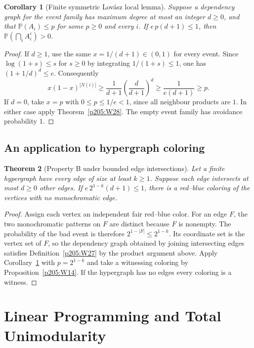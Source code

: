 \documentclass[11pt,oneside,openany]{book}
\theoremstyle{plain}
\newtheorem{theorem}{Theorem}[chapter]
\newtheorem{corollary}[theorem]{Corollary}
\theoremstyle{definition}
\theoremstyle{remark}
\begin{document}
\begin{corollary}[Finite symmetric Lov\'asz local lemma]
\label{p205:W29}
Suppose a dependency graph for the event family has maximum degree
at most an integer \(d\ge0\), and that \(\mathbb P(A_i)\le p\) for
some \(p\ge0\) and every \(i\). If \(e\,p(d+1)\le1\), then
\(\mathbb P(\bigcap_i A_i^c)>0\).
\end{corollary}

\begin{proof}
If \(d\ge1\), use the same \(x=1/(d+1)\in(0,1)\) for every event.
Since \(\log(1+s)\le s\) for \(s\ge0\) by integrating
\(1/(1+s)\le1\), one has \((1+1/d)^d\le e\). Consequently
\[
 x(1-x)^{|N(i)|}\ge \frac{1}{d+1}\left(\frac d{d+1}\right)^d
     \ge\frac{1}{e(d+1)}\ge p .
\]
If \(d=0\), take \(x=p\) with \(0\le p\le1/e<1\), since all neighbour
products are \(1\). In either case apply Theorem~\ref{p205:W28}.
The empty event family has avoidance probability \(1\).
\end{proof}

\section{An application to hypergraph coloring}

\begin{theorem}[Property B under bounded edge intersections]
\label{p205:W30}
Let a finite hypergraph have every edge of size at least \(k\ge1\).
Suppose each edge intersects at most \(d\ge0\) other edges.
If \(e\,2^{1-k}(d+1)\le1\), there is a red--blue coloring
of the vertices with no monochromatic edge.
\end{theorem}

\begin{proof}
Assign each vertex an independent fair red--blue color.
For an edge \(F\), the two monochromatic patterns on \(F\) are
distinct because \(F\) is nonempty. The probability of the bad
event is therefore \(2^{1-|F|}\le 2^{1-k}\). Its coordinate set
is the vertex set of \(F\), so the dependency graph obtained by
joining intersecting edges satisfies Definition~\ref{p205:W27}
by the product argument above. Apply
Corollary~\ref{p205:W29} with \(p=2^{1-k}\) and take a witnessing
coloring by Proposition~\ref{p205:W14}. If the hypergraph has
no edges every coloring is a witness.
\end{proof}
\chapter{Linear Programming and Total Unimodularity}
\end{document}
